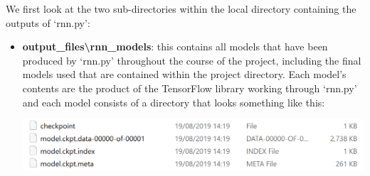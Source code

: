 \documentclass[12pt,twoside]{report}
\begin{document}
\quad We first look at the two sub-directories within the local directory containing the outputs of ‘rnn.py’:

\begin{itemize}
	\item \textbf{output\_files\textbackslash rnn\_models}: this contains all models that have been produced by ‘rnn.py’ throughout the course of the project, including the final models used that are contained within the project directory. Each model’s contents are the product of the TensorFlow library working through ‘rnn.py’ and each model consists of a directory that looks something like this:
\begin{center}
\includegraphics[scale=0.3]{project_figures/fig6_1}
\end{center}


\end{itemize}
\end{document}
